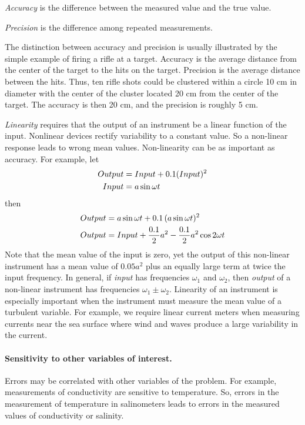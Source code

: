\textit{Accuracy} is the difference between the
measured value and the true value.

\textit{Precision} is the difference among
repeated measurements.

The distinction between accuracy and precision is usually illustrated
by the simple example of firing a rifle at a target. Accuracy is the
average distance from the center of the target to the hits on the
target. Precision is the average distance between the hits. Thus, ten
rifle shots could be clustered within a circle 10 cm in diameter with
the center of the cluster located 20 cm from the center of the
target. The accuracy is then 20 cm, and the precision is roughly 5 cm.

\textit{Linearity} requires that the output of
an instrument be a linear function of the input. Nonlinear devices
rectify variability to a constant value. So a non-linear response
leads to wrong mean values. Non-linearity can be as important as
accuracy.  For example, let
\begin{align}
Output &= Input + 0.1(Input)^2 \notag \\
Input &= a \sin \omega t \notag
\end{align}
then
\begin{align}
Output &= a \sin \omega t + 0.1\,(a \sin \omega t)^2 \notag \\
Output &= Input + \frac{0.1}{2} a^2 - \frac{0.1}{2} a^2 \cos 2\omega t
\notag
\end{align}
Note that the mean value of the input is zero, yet the output of this
non-linear instrument has a mean value of \(0.05 a^2\) plus an equally
large term at twice the input frequency. In general, if \textit{input}
has frequencies \(\omega_1\) and \(\omega_2\), then \textit{output} of
a non-linear instrument has frequencies \(\omega_1 \pm \omega_2\).
Linearity of an instrument is especially important when
the instrument must measure the mean value of a turbulent
variable. For example, we require linear current meters when measuring
currents near the sea surface where wind and waves produce a large
variability in the current.

\paragraph{Sensitivity to other variables of interest.}
Errors may be correlated with other variables of the problem. For
example, measurements of conductivity are sensitive to
temperature. So, errors in the measurement of temperature in
salinometers leads to errors in the measured values of conductivity or
salinity.

